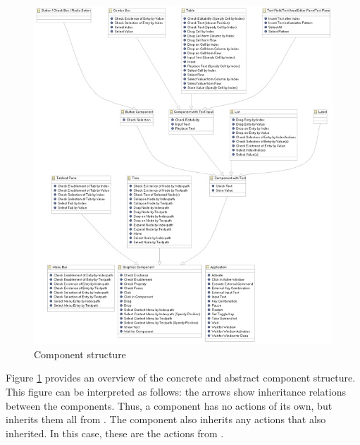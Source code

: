 
\begin{figure}
\begin{center}
\includegraphics{Overview/PS/GUIdancerComponentHierarchysmall}
\caption{Component structure}
\label{comp}
\end{center}
\end{figure}

Figure \ref{comp} provides an overview of the concrete and abstract component structure. This figure can be interpreted as follows: the arrows show inheritance relations between the components. Thus, a  component has no actions of its own, but inherits them all from . The  component also inherits any actions that  also inherited. In this case, these are the actions from . 

\clearpage
